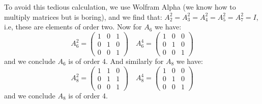 \documentclass[notitlepage]{report}
\begin{document}
\begin{mdframed}[]
	To avoid this tedious calculation, we use Wolfram Alpha (we know how to multiply matrices but is boring), and we find that:
	$A_2^2 = A_3^2 = A_4^2 = A_5^2 = A_7^2 = I $, i.e, these are elements of order two.
	Now for $A_6$ we have:
	\[ A_6^2 = 
	\begin{pmatrix}
	1&0&1  \\ 
	0&1&0 \\    
	0&0&1
	\end{pmatrix} \quad A_6^4 = 	\begin{pmatrix}
	1&0&0  \\ 
	0&1&0 \\    
	0&0&1
	\end{pmatrix}\]
	and we conclude $A_6$ is of order 4.
	And similarly for $A_8$ we have:
	\[ A_8^2 =
	\begin{pmatrix}
	1&1&0  \\ 
	0&1&1 \\    
	0&0&1
	\end{pmatrix} \quad A_8^4 = \begin{pmatrix}
	1&0&0  \\ 
	0&1&0 \\    
	0&0&1
	\end{pmatrix} \]
	and we conclude $A_8$ is of order 4.
\end{mdframed}
\end{document}
